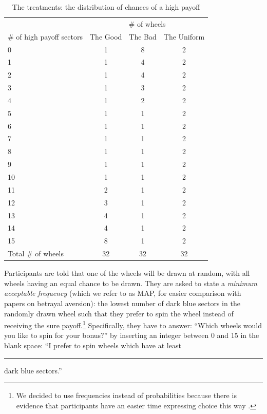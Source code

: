 \begin{table}[htbp]
\centering \caption{The treatments: the distribution of chances of a high payoff}\label{tab:distr}
\begin{threeparttable}
\begin{tabular}
   {@{}
	l
	*3c
	@{}
	}
\toprule
	&	\multicolumn{3}{c}{\# of wheels}\\
	\cmidrule{2-4}
\# of high payoff sectors 	&	{The Good}&{The Bad}&	{The Uniform}\\
\cmidrule{2-4}
0	&	1&       8&	2\\
1	&	1&       4&	2\\
2	&	1&       4&	2\\
3	&	1&       3&	2\\
4	&	1&       2&	2\\
5	&	1&       1&	2\\
6	&	1&       1&	2\\
7	&	1&       1&	2\\
8	&	1&       1&	2\\
9	&	1&       1&	2\\
10	&	1&       1&	2\\
11	&	2&       1&	2\\
12	&	3&       1&	2\\
13	&	4&       1&	2\\
14	&	4&       1&	2\\
15	&	8&       1&	2\\
\midrule
Total \# of wheels	&	32&       32&	32\\
\bottomrule

\end{tabular}
\end{threeparttable}
\end{table}

Participants are told that one of the wheels will be drawn at random, with all wheels having an equal chance to be drawn.
They are asked to state a \textit{minimum acceptable frequency} (which we refer to as MAP, for easier comparison with papers on betrayal aversion): the lowest number of dark blue sectors in the randomly drawn wheel such that they prefer to spin the wheel instead of receiving the sure payoff.\footnote{
We decided to use frequencies instead of probabilities because there is evidence that participants have an easier time expressing choice this way \citep{Quercia2016}.}
Specifically, they have to answer: ``Which wheels would you like to spin for your bonus?'' by inserting an integer between 0 and 15 in the blank space: ``I prefer to spin wheels which have at least \rule{1cm}{0.15mm} dark blue sectors.''

